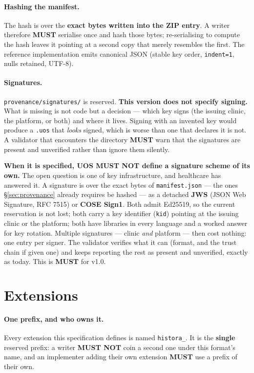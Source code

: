 \documentclass[11pt,a4paper]{article}
\newcommand{\MUST}{\textcolor{uosred}{\textbf{MUST}}}
\newcommand{\MUSTNOT}{\textcolor{uosred}{\textbf{MUST NOT}}}
\newcommand{\code}[1]{\texttt{\small #1}}
\begin{document}
\paragraph{Hashing the manifest.} The hash is over the \textbf{exact bytes written into the
ZIP entry}. A writer therefore \MUST{} serialise once and hash those bytes; re-serialising
to compute the hash leaves it pointing at a second copy that merely resembles the first.
The reference implementation emits canonical JSON (stable key order, \code{indent=1}, nulls
retained, UTF-8).

\paragraph{Signatures.} \code{provenance/signatures/} is reserved. \textbf{This version does not
specify signing.} What is missing is not code but a decision --- which key signs (the
issuing clinic, the platform, or both) and where it lives. Signing with an invented key
would produce a \code{.uos} that \emph{looks} signed, which is worse than one that declares
it is not. A validator that encounters the directory \MUST{} warn that the signatures are
present and unverified rather than ignore them silently.

\textbf{When it is specified, UOS \MUSTNOT{} define a signature scheme of its own.} The
open question is one of key infrastructure, and healthcare has answered it. A signature is
over the exact bytes of \code{manifest.json} --- the ones \S\ref{sec:provenance} already
requires be hashed --- as a detached \textbf{JWS} (JSON Web Signature, RFC 7515) or
\textbf{COSE Sign1}. Both admit Ed25519, so the current reservation is not lost; both carry
a key identifier (\code{kid}) pointing at the issuing clinic or the platform; both have
libraries in every language and a worked answer for key rotation. Multiple signatures ---
clinic \emph{and} platform --- then cost nothing: one entry per signer. The validator
verifies what it can (format, and the trust chain if given one) and keeps reporting the
rest as present and unverified, exactly as today. This is \MUST{} for v1.0.

\section{Extensions}\label{sec:extensions}

\paragraph{One prefix, and who owns it.}
Every extension this specification defines is named \code{histora\_}. It is the
\textbf{single} reserved prefix: a writer \MUSTNOT{} coin a second one under this format's
name, and an implementer adding their own extension \MUST{} use a prefix of their own.
\end{document}
